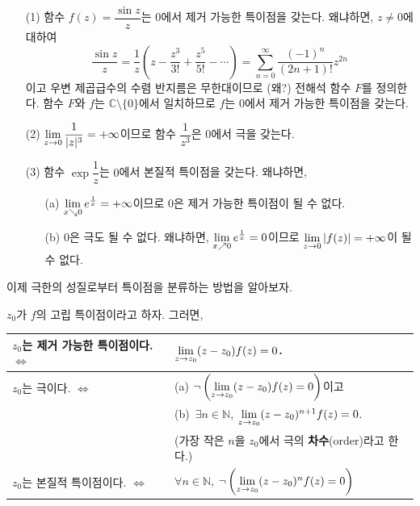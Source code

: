\begin{saltexample}[label=example-4-14]{}{}
\begin{itemize}
\item[(1)] 함수 $f(z)=\dfrac{\sin z}z$는 $0$에서 제거 가능한 특이점을 갖는다.
왜냐하면, $z\ne0$에 대하여
\[
\dfrac{\sin z}z = \dfrac 1z\left( z - \dfrac{z^3}{3!} + \dfrac{z^5}{5!} - \cdots
\right) = \sum_{n=0}^\infty \dfrac{(-1)^n}{(2n+1)!}z^{2n}
\]
이고 우변 제곱급수의 수렴 반지름은 무한대이므로 (왜?)
전해석 함수 $F$를 정의한다. 함수 $F$와 $f$는 $\mathbb C\setminus \{0\}$에서
일치하므로 $f$는 $0$에서 제거 가능한 특이점을 갖는다.
\item[(2)] $\lim\limits_{z\to 0} \displaystyle\frac1{|z|^3} = + \infty$이므로
함수 $\dfrac1{z^3}$은 $0$에서 극을 갖는다.
\item[(3)] 함수 $\exp \dfrac1z$는 $0$에서 본질적 특이점을 갖는다. 왜냐하면,
\begin{itemize}
\item[(a)] $\lim\limits_{x\searrow 0} e^{\frac1x} = + \infty$이므로
$0$은 제거 가능한 특이점이 될 수 없다.
\item[(b)] $0$은 극도 될 수 없다. 왜냐하면,
$\lim\limits_{x\nearrow 0} e^{\frac1x} =0$이므로  
$\lim\limits_{z\to 0} |f(z)| = + \infty$이 될 수 없다.
\end{itemize}
\end{itemize}
\end{saltexample}

이제 극한의 성질로부터 특이점을 분류하는 방법을 알아보자.

\begin{salttheorem} {}{} \label{thm-4-8}
$z_0$가 $f$의 고립 특이점이라고 하자. 그러면,
\begin{center}
{\footnotesize
\begin{tabular}{ |p{4.5cm}|p{6.5cm}| } 
 \hline
$z_0$는 제거 가능한 특이점이다.   \hfill $\Leftrightarrow$ 
& $\lim\limits_{z\to z_0} (z-z_0)f(z)=0$. \\ \hline 
$z_0$는 극이다. \hfill $\Leftrightarrow$ 
& (a) $\neg \left( \lim\limits_{z\to z_0} (z-z_0)f(z) = 0 \right)$이고 \\
& (b)~$\exists n\in \mathbb N$, 
$\lim\limits_{z\to z_0} (z-z_0)^{n+1}f(z) = 0$. \\
& (가장 작은 $n$을 $z_0$에서 극의 \textbf{차수}(order)라고 한다.) \\ \hline
$z_0$는 본질적 특이점이다. \hfill $\Leftrightarrow$ 
& $\forall n\in \mathbb N$,  
$\neg\left( \lim\limits_{z\to z_0} (z-z_0)^nf(z) = 0 \right)$ \\ 
 \hline
\end{tabular}
}
\end{center}
\end{salttheorem}

